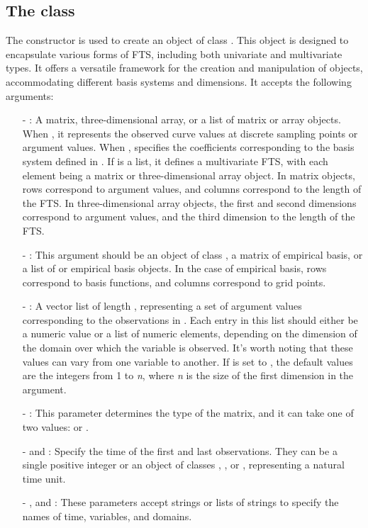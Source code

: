 \subsection{The  class}\label{subsec:fts}
The  constructor is used to create an  object of 
class . This object is designed to encapsulate various forms of 
FTS, including both univariate and multivariate types. It offers a 
versatile framework for the creation and manipulation of   objects, 
accommodating different basis systems and dimensions. It accepts 
the following arguments:
 \begin{itemize}
 	\item[-] : A matrix, three-dimensional array, or a list of matrix or 
 	array objects. When , it represents the observed curve 
 	values at discrete sampling points or argument values. When 
 	,  specifies the coefficients corresponding to the 
 	basis system defined in . If  is a list, it defines a 
 	multivariate FTS, with each element being a matrix or three-dimensional array 
 	object. In matrix objects, rows correspond to argument values, and columns 
 	correspond to the length of the FTS. In three-dimensional array objects, the 
 	first and second dimensions correspond to argument values, and the third 
 	dimension to the length of the FTS.	
 	\item[-] : This argument should be an object of class 
 	, a matrix of empirical basis, or a list of  or 
 	empirical basis objects. In the case of empirical basis, rows correspond to 
 	basis functions, and columns correspond to grid points.
 	\item[-] : A vector list of length , 
 	representing a set of argument values corresponding to the observations in 
 	. Each entry in this list should either be a numeric value or a list of 
 	numeric elements, depending on the dimension of the domain over which the 
 	variable is observed. It's worth noting that these values can vary from one 
 	variable to another. If  is set to , the default values 
 	are the integers from 1 to \textit{n}, where \textit{n} is the size of the first 
 	dimension in the  argument. 	
 	\item[-] : This parameter determines the type of the  
 	matrix, and it can take one of two values:  or . 	
 	\item[-]  and : Specify the time of the first and last observations. They can be a 
 	single positive integer or an object of classes , , or 
 	, representing a natural time unit.
 	\item[-] ,  and : These parameters accept strings or lists of strings to specify the names of time, variables, and domains.
 \end{itemize}
